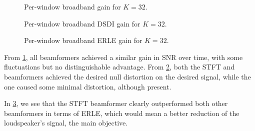 
\begin{figure}[H]
	\centering
	
	\caption{Per-window broadband gain for $K = 32$.}
	\label{fig:lineplot_gain_32}
\end{figure}
\begin{figure}[H]
	\centering
	
	\caption{Per-window broadband DSDI gain for $K = 32$.}
	\label{fig:lineplot_dsdi_32}
\end{figure}
\begin{figure}[H]
	\centering
	
	\caption{Per-window broadband ERLE gain for $K = 32$.}
	\label{fig:lineplot_erle_32}
\end{figure}

From \cref{fig:lineplot_gain_32}, all beamformers achieved a similar gain in SNR over time, with some fluctuations but no distinguishable advantage. From \cref{fig:lineplot_dsdi_32}, both the STFT and \nssbt{} beamformers achieved the desired null distortion on the desired signal, while the \nssbt{} one caused some minimal distortion, although present.

In \cref{fig:lineplot_erle_32}, we see that the STFT beamformer clearly outperformed both other beamformers in terms of ERLE, which would mean a better reduction of the loudspeaker's signal, the main objective.





